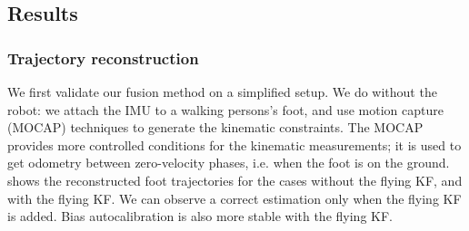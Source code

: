 \subsection{Results}
\subsubsection{Trajectory reconstruction}

We first validate our fusion method on a simplified setup. We do without the robot: we attach the IMU to a walking persons's foot, and use motion capture (MOCAP) techniques to generate the kinematic constraints. 
The MOCAP provides more controlled conditions for the kinematic measurements; it is used to get odometry between zero-velocity phases, i.e. when the foot is on the ground.
 shows the reconstructed foot trajectories for the cases without the flying KF, and with the flying KF. We can observe a correct estimation only when the flying KF is added. Bias autocalibration is also more stable with the flying KF.

%

